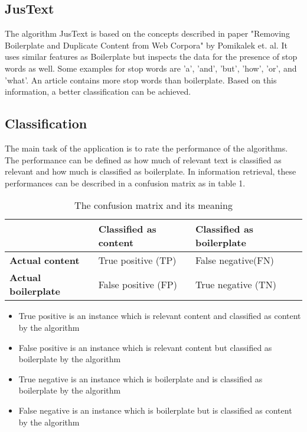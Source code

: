  \subsection{JusText}

The algorithm JusText \cite{algo:justext} is based on the concepts described in paper "Removing Boilerplate and Duplicate Content from Web Corpora" \cite{paper:justext} by Pomikalek et. al. It uses similar features as Boilerplate but inspects the data for the presence of stop words as well. Some examples for stop words are 'a', 'and', 'but', 'how', 'or', and 'what'. An article contains more stop words than boilerplate. Based on this information, a better classification can be achieved.

\subsection{Classification}

The main task of the application is to rate the performance of the algorithms. The performance can be defined as how much of relevant text is classified as relevant and how much is classified as boilerplate. In information retrieval, these performances can be described in a confusion matrix as in table 1. 

\begin{table}[!ht]
\begin{tabular}{|p{4cm} |p{5.5cm} |p{5.5cm} |}\hline
          								& \textbf{Classified as content} 	& \textbf{Classified as boilerplate} 	\\ \hline
\textbf{Actual content} 				& True positive (TP)				& False negative(FN)					\\ \hline
\textbf{Actual boilerplate} 			& False positive (FP)       		& True negative (TN)				 	\\ \hline
\end{tabular}
\caption[asdfasdf]{The confusion matrix and its meaning}
\label{confusionMatrix}
\end{table}

\begin{itemize}
\item True positive is an instance which is relevant content and classified as content by the algorithm
\item False positive is an instance which is relevant content but classified as boilerplate by the algorithm 
\item True negative is an instance which is boilerplate and is classified as boilerplate by the algorithm
\item False negative is an instance which is boilerplate but is classified as content by the algorithm
\end{itemize}

